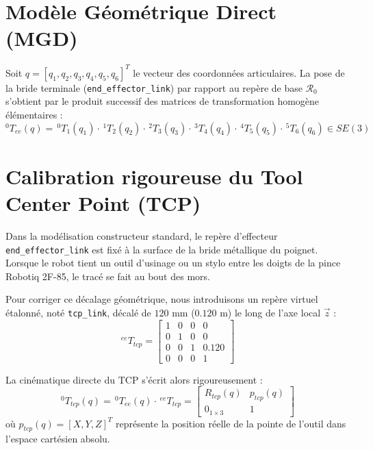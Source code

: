 \documentclass[11pt,a4paper]{report}
\begin{document}
\section{Modèle Géométrique Direct (MGD)}
Soit $q = [q_1, q_2, q_3, q_4, q_5, q_6]^T$ le vecteur des coordonnées articulaires. La pose de la bride terminale (\texttt{end\_effector\_link}) par rapport au repère de base $\mathcal{R}_0$ s'obtient par le produit successif des matrices de transformation homogène élémentaires :
\begin{equation}
    ^{0}T_{ee}(q) = \,^{0}T_1(q_1) \cdot \,^{1}T_2(q_2) \cdot \,^{2}T_3(q_3) \cdot \,^{3}T_4(q_4) \cdot \,^{4}T_5(q_5) \cdot \,^{5}T_6(q_6) \in SE(3)
\end{equation}

\section{Calibration rigoureuse du Tool Center Point (TCP)}
Dans la modélisation constructeur standard, le repère d'effecteur \texttt{end\_effector\_link} est fixé à la surface de la bride métallique du poignet. Lorsque le robot tient un outil d'usinage ou un stylo entre les doigts de la pince Robotiq 2F-85, le tracé se fait au bout des mors.

Pour corriger ce décalage géométrique, nous introduisons un repère virtuel étalonné, noté \texttt{tcp\_link}, décalé de $120\text{ mm}$ ($0.120\text{ m}$) le long de l'axe local $\vec{z}$ :
\begin{equation}
    ^{ee}T_{tcp} = \begin{bmatrix}
        1 & 0 & 0 & 0 \\
        0 & 1 & 0 & 0 \\
        0 & 0 & 1 & 0.120 \\
        0 & 0 & 0 & 1
    \end{bmatrix}
\end{equation}

La cinématique directe du TCP s'écrit alors rigoureusement :
\begin{equation}
    ^{0}T_{tcp}(q) = \,^{0}T_{ee}(q) \cdot \,^{ee}T_{tcp} = 
    \begin{bmatrix}
        R_{tcp}(q) & p_{tcp}(q) \\
        0_{1\times 3} & 1
    \end{bmatrix}
\end{equation}
où $p_{tcp}(q) = [X, Y, Z]^T$ représente la position réelle de la pointe de l'outil dans l'espace cartésien absolu.
\end{document}
